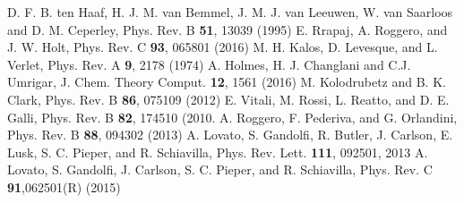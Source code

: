 \begin{thebibliography}{99.}
D. F. B. ten Haaf, H. J. M. van Bemmel, J. M. J. van Leeuwen, W. van Saarloos and D. M. Ceperley,  Phys. Rev. B {\bf 51}, 13039 (1995)
E. Rrapaj, A. Roggero, and J. W. Holt, Phys. Rev. C {\bf 93}, 065801 (2016)
M. H. Kalos, D. Levesque, and L. Verlet,  Phys. Rev. A {\bf 9}, 2178 (1974)
A. Holmes, H. J. Changlani and C.J. Umrigar, J. Chem. Theory Comput. {\bf 12}, 1561 (2016)
M. Kolodrubetz and B. K. Clark, Phys. Rev. B {\bf 86}, 075109 (2012)
E. Vitali, M. Rossi, L. Reatto, and D. E. Galli,  Phys. Rev. B {\bf 82}, 174510 (2010.
A. Roggero, F. Pederiva, and G. Orlandini, Phys. Rev. B {\bf 88}, 094302 (2013)
A. Lovato, S. Gandolfi, R. Butler, J. Carlson, E. Lusk, S. C. Pieper, and R. Schiavilla,  Phys. Rev. Lett. {\bf 111}, 092501, 2013
A. Lovato, S. Gandolfi, J. Carlson, S. C. Pieper, and R. Schiavilla, Phys. Rev. C {\bf 91},062501(R) (2015)
\end{thebibliography}







